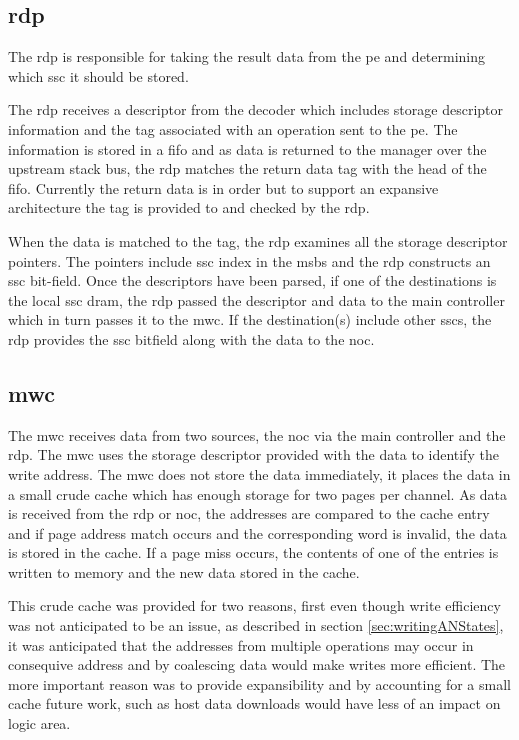 \subsection{\Acf{rdp}}
\label{sec:RDP}
The \ac{rdp} is responsible for taking the result data from the \ac{pe} and determining which \ac{ssc} it should be stored.

The \ac{rdp} receives a descriptor from the decoder which includes storage descriptor information and the tag associated with an operation sent to the \ac{pe}.
The information is stored in a \ac{fifo} and as data is returned to the manager over the upstream stack bus, the \ac{rdp} matches the return data tag with the head of the \ac{fifo}.
Currently the return data is in order but to support an expansive architecture the tag is provided to and checked by the \ac{rdp}.

When the data is matched to the tag, the \ac{rdp} examines all the storage descriptor pointers. The pointers include \ac{ssc} index in the \acp{msb} and the \ac{rdp} constructs an \ac{ssc} bit-field.
Once the descriptors have been parsed, if one of the destinations is the local \ac{ssc} \ac{dram}, the \ac{rdp} passed the descriptor and data to the main controller which in turn passes it to the \ac{mwc}.
If the destination(s) include other \acp{ssc}, the \ac{rdp} provides the \ac{ssc} bitfield along with the data to the \ac{noc}.


\subsection{\Acf{mwc}}
\label{sec:MWC}

The \acf{mwc} receives data from two sources, the \ac{noc} via the main controller and the \ac{rdp}.
The \ac{mwc} uses the storage descriptor provided with the data to identify the write address.
The \ac{mwc} does not store the data immediately, it places the data in a small crude cache which has enough storage for two pages per channel.
As data is received from the \ac{rdp} or \ac{noc}, the addresses are compared to the cache entry and if page address match occurs and the corresponding word is invalid, the data is stored in the cache.
If a page miss occurs, the contents of one of the entries is written to memory and the new data stored in the cache.

This crude cache was provided for two reasons, first even though write efficiency was not anticipated to be an issue, as described in section \ref{sec:writingANStates}, it was anticipated that the addresses from multiple operations may occur in consequive address and by coalescing data would make writes more efficient.
The more important reason was to provide expansibility and by accounting for a small cache future work, such as host data downloads would have less of an impact on logic area.


